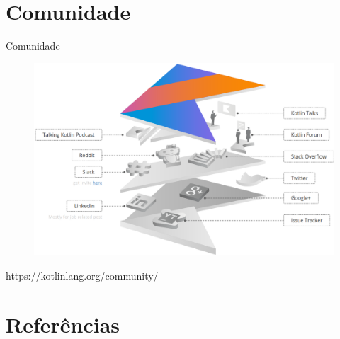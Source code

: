 \documentclass{beamer}
\begin{document}
\section{Comunidade}

	\begin{frame}{Comunidade}
	
		\begin{figure}[!htb]
			\centering
			\includegraphics[scale=.23]{comunidade.png}
		\end{figure}
	
	https://kotlinlang.org/community/
	
	\end{frame}





\section{Referências}
	
\end{document}
